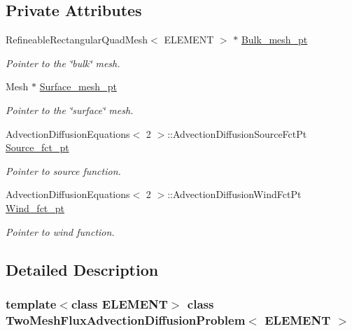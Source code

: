 \subsection*{Private Attributes}
\begin{DoxyCompactItemize}
\item 
Refineable\+Rectangular\+Quad\+Mesh$<$ E\+L\+E\+M\+E\+NT $>$ $\ast$ \hyperlink{classTwoMeshFluxAdvectionDiffusionProblem_ad022fed8fda1294ac4e86b893f32d63c}{Bulk\+\_\+mesh\+\_\+pt}
\begin{DoxyCompactList}\small\item\em Pointer to the \char`\"{}bulk\char`\"{} mesh. \end{DoxyCompactList}\item 
Mesh $\ast$ \hyperlink{classTwoMeshFluxAdvectionDiffusionProblem_a0b1a0dd20caad23315b6837bb773327e}{Surface\+\_\+mesh\+\_\+pt}
\begin{DoxyCompactList}\small\item\em Pointer to the \char`\"{}surface\char`\"{} mesh. \end{DoxyCompactList}\item 
Advection\+Diffusion\+Equations$<$ 2 $>$\+::Advection\+Diffusion\+Source\+Fct\+Pt \hyperlink{classTwoMeshFluxAdvectionDiffusionProblem_a73a3fdaa5eb9cfffc19ed0cd8fd8379c}{Source\+\_\+fct\+\_\+pt}
\begin{DoxyCompactList}\small\item\em Pointer to source function. \end{DoxyCompactList}\item 
Advection\+Diffusion\+Equations$<$ 2 $>$\+::Advection\+Diffusion\+Wind\+Fct\+Pt \hyperlink{classTwoMeshFluxAdvectionDiffusionProblem_acec16e75f69f21f927dd6a4671cd64ea}{Wind\+\_\+fct\+\_\+pt}
\begin{DoxyCompactList}\small\item\em Pointer to wind function. \end{DoxyCompactList}\end{DoxyCompactItemize}


\subsection{Detailed Description}
\subsubsection*{template$<$class E\+L\+E\+M\+E\+NT$>$\newline
class Two\+Mesh\+Flux\+Advection\+Diffusion\+Problem$<$ E\+L\+E\+M\+E\+N\+T $>$}

